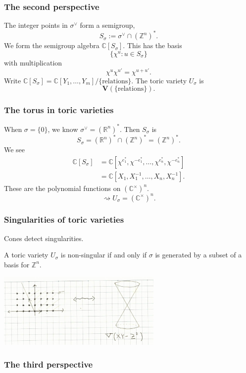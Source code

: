 \documentclass{beamer}
\theoremstyle{definition}
\theoremstyle{definition}
\begin{document}
\begin{frame}
\frametitle{The \alert{second perspective}}
The integer points in $\sigma^\vee$ form a \alert{semigroup},
$$S_\sigma := \sigma^\vee \cap (\mathbb{Z}^n)^*.$$
We form the \alert{semigroup algebra} $\mathbb{C}[S_\sigma]$.
This has the basis
$$\{\chi^u : u \in S_\sigma\}$$
with multiplication 
$$\chi^u \chi^{u'} = \chi^{u + u'}.$$
Write $\mathbb{C}[S_\sigma] = \mathbb{C}[Y_1, \ldots, Y_m]/\{\text{relations}\}.$
The \alert{toric variety} $U_\sigma$ is
$$\mathbf{V}(\{\text{relations}\}).$$
\end{frame}

\begin{frame}
\frametitle{The torus in toric varieties}
When $\sigma = \{0\}$, we know $\sigma^\vee = (\mathbb{R}^n)^*$.
Then $S_\sigma$ is
$$S_\sigma = (\mathbb{R}^n)^* \cap (\mathbb{Z}^n)^* = (\mathbb{Z}^n)^*.$$
We see
\begin{align*}
	\mathbb{C}[S_\sigma] &= \mathbb{C}[\chi^{e_1^*}, \chi^{-e_1^*}, \ldots, \chi^{e_n^*}, \chi^{-e_n^*}] \\
		&= \mathbb{C}[X_1, X_1^{-1}, \ldots, X_n, X_n^{-1}].
\end{align*}
These are the polynomial functions on $(\mathbb{C}^\times)^n$.
$$\rightsquigarrow U_\sigma = (\mathbb{C}^\times)^n.$$
\end{frame}


\begin{frame}
\frametitle{Singularities of toric varieties}
Cones detect singularities.

A toric variety $U_\sigma$ is non-singular if and only if $\sigma$ is generated by a subset of a basis for $\mathbb{Z}^n$.

\centerline{\includegraphics[width=0.6\textwidth]{cone_and_variety}}
\end{frame}

\begin{frame}
\frametitle{The \alert{third perspective}}


\end{frame}
\end{document}
